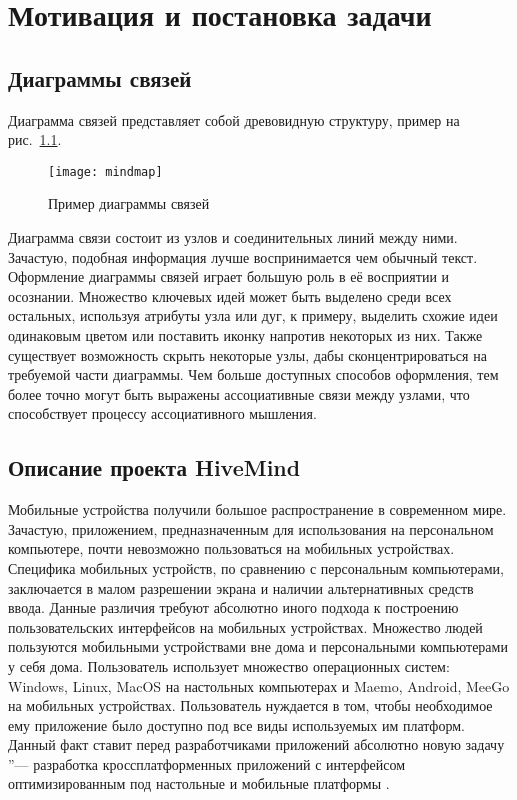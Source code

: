 \newpage

\chapter{Мотивация и постановка задачи}
\label{ch:chapter_1}

\section{Диаграммы связей}
\label{sec:mindmaps}
Диаграмма связей представляет собой древовидную структуру, пример на
рис.~\ref{pic:mindmap}.

\begin{figure}[h!]
  \centering \texttt{[image: mindmap]}
  \caption{Пример диаграммы связей}
  \label{pic:mindmap}
\end{figure}

Диаграмма связи состоит из узлов и соединительных линий между ними. Зачастую,
подобная информация лучше воспринимается чем обычный текст. Оформление диаграммы
связей играет большую роль в её восприятии и осознании. Множество ключевых идей
может быть выделено среди всех остальных, используя атрибуты узла или дуг, к
примеру, выделить схожие идеи одинаковым цветом или поставить иконку напротив
некоторых из них. Также существует возможность скрыть некоторые узлы, дабы
сконцентрироваться на требуемой части диаграммы. Чем больше доступных способов
оформления, тем более точно могут быть выражены ассоциативные связи между
узлами, что способствует процессу ассоциативного мышления.


\section{Описание проекта HiveMind}
\label{sec:project_summary}
Мобильные устройства получили большое распространение в современном мире.
Зачастую, приложением, предназначенным для использования на персональном
компьютере, почти невозможно пользоваться на мобильных устройствах. Специфика
мобильных устройств, по сравнению с персональным компьютерами, заключается в
малом разрешении экрана и наличии альтернативных средств ввода. Данные различия
требуют абсолютно иного подхода к построению пользовательских интерфейсов на
мобильных устройствах. Множество людей пользуются мобильными устройствами вне
дома и персональными компьютерами у себя дома. Пользователь использует множество
операционных систем: Windows, Linux, MacOS на настольных компьютерах и Maemo,
Android, MeeGo на мобильных устройствах. Пользователь нуждается в том, чтобы
необходимое ему приложение было доступно под все виды используемых им платформ.
Данный факт ставит перед разработчиками приложений абсолютно новую задачу  ''---
разработка кроссплатформенных приложений с интерфейсом оптимизированным под
настольные и мобильные платформы \cite{hivemind-8th-fruct}.

